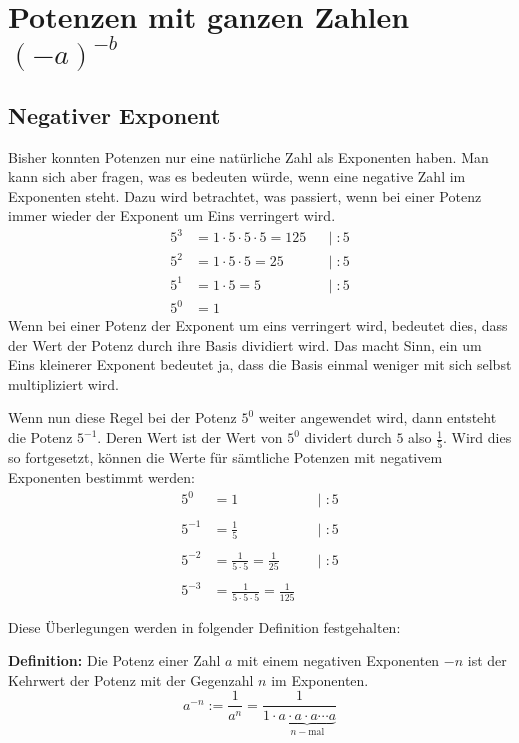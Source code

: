 \newpage
\section{Potenzen mit ganzen Zahlen $(-a)^{-b}$}

\subsection{Negativer Exponent}

Bisher konnten Potenzen nur eine natürliche Zahl als Exponenten haben. Man kann sich aber fragen, was es bedeuten würde, wenn eine negative Zahl im Exponenten steht. Dazu wird betrachtet, was passiert, wenn bei einer Potenz immer wieder der Exponent um Eins verringert wird.
\begin{align*}
  5^{3} &= 1\cdot 5\cdot 5\cdot 5 = 125 && |\; :5\\
  5^{2} &= 1\cdot 5\cdot 5 = 25         && |\; :5\\
  5^{1} &= 1\cdot 5 = 5                 && |\; :5\\
  5^{0} &= 1
\end{align*}
Wenn bei einer Potenz der Exponent um eins verringert wird, bedeutet dies, dass der Wert der Potenz durch ihre Basis dividiert wird. Das macht Sinn, ein um Eins kleinerer Exponent bedeutet ja, dass die Basis einmal weniger mit sich selbst multipliziert wird.

Wenn nun diese Regel bei der Potenz $5^{0}$ weiter angewendet wird, dann entsteht die Potenz $5^{-1}$. Deren Wert ist der Wert von $5^{0}$ dividert durch $5$ also $\frac{1}{5}$. Wird dies so fortgesetzt, können die Werte für sämtliche Potenzen mit negativem Exponenten bestimmt werden:
\begin{align*}
  5^{0}    &= 1                               && |\; :5\\\\
  5^{-1} &= \frac{1}{5}                       && |\; :5\\\\
  5^{-2} &= \frac{1}{5\cdot 5} = \frac{1}{25} && |\; :5\\\\
  5^{-3} &= \frac{1}{5\cdot 5\cdot 5} = \frac{1}{125}
\end{align*}

Diese Überlegungen werden in folgender Definition festgehalten:

\textbf{Definition:} Die Potenz einer Zahl $a$ mit einem negativen Exponenten $-n$ ist der Kehrwert der Potenz mit der Gegenzahl $n$ im Exponenten.
\[
  a^{-n} := \frac{1}{a^{n}} = \frac{1}{1\cdot\underbrace{a\cdot a\cdot a\cdots a}_{n-\text{mal}}}
\]

